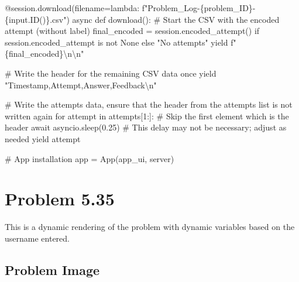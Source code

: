 \documentclass[
  letterpaper,
  DIV=11,
  numbers=noendperiod]{scrreprt}
\newenvironment{Shaded}{\begin{snugshade}}{\end{snugshade}}
\newcommand{\NormalTok}[1]{\textcolor[rgb]{0.00,0.23,0.31}{#1}}
\begin{document}
\begin{Shaded}
\begin{Highlighting}[]
\NormalTok{    @session.download(filename=lambda: f"Problem\_Log{-}\{problem\_ID\}{-}\{input.ID()\}.csv")}
\NormalTok{    async def download():}
\NormalTok{        \# Start the CSV with the encoded attempt (without label)}
\NormalTok{        final\_encoded = session.encoded\_attempt() if session.encoded\_attempt is not None else "No attempts"}
\NormalTok{        yield f"\{final\_encoded\}\textbackslash{}n\textbackslash{}n"}
        
\NormalTok{        \# Write the header for the remaining CSV data once}
\NormalTok{        yield "Timestamp,Attempt,Answer,Feedback\textbackslash{}n"}
        
\NormalTok{        \# Write the attempts data, ensure that the header from the attempts list is not written again}
\NormalTok{        for attempt in attempts[1:]:  \# Skip the first element which is the header}
\NormalTok{            await asyncio.sleep(0.25)  \# This delay may not be necessary; adjust as needed}
\NormalTok{            yield attempt}


\NormalTok{\# App installation}
\NormalTok{app = App(app\_ui, server)}
\end{Highlighting}
\end{Shaded}

\chapter*{Problem 5.35}\label{problem-5.35}


This is a dynamic rendering of the problem with dynamic variables based
on the username entered.

\section*{Problem Image}\label{problem-image-21}

\end{document}
